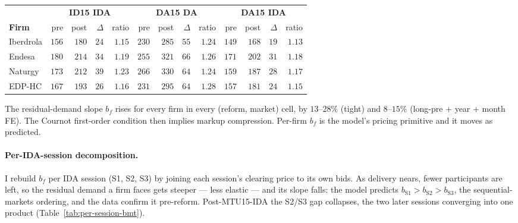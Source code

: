 \documentclass[11pt,a4paper]{article}
\theoremstyle{definition}
\theoremstyle{remark}
\theoremstyle{plain}
\begin{document}
\begin{center}
\footnotesize
\setlength{\tabcolsep}{4pt}
\begin{tabular}{l r r r r r r r r r r r r}
\toprule
        & \multicolumn{4}{c}{\textbf{ID15 IDA}} & \multicolumn{4}{c}{\textbf{DA15 DA}} & \multicolumn{4}{c}{\textbf{DA15 IDA}} \\
\cmidrule(lr){2-5} \cmidrule(lr){6-9} \cmidrule(lr){10-13}
\textbf{Firm}     & pre & post & $\Delta$ & ratio & pre & post & $\Delta$ & ratio & pre & post & $\Delta$ & ratio \\
\midrule
Iberdrola         & $156$ & $180$ & $24$ & $1.15$ & $230$ & $285$ & $55$ & $1.24$ & $149$ & $168$ & $19$ & $1.13$ \\
Endesa            & $180$ & $214$ & $34$ & $1.19$ & $255$ & $321$ & $66$ & $1.26$ & $171$ & $202$ & $31$ & $1.18$ \\
Naturgy           & $173$ & $212$ & $39$ & $1.23$ & $266$ & $330$ & $64$ & $1.24$ & $159$ & $187$ & $28$ & $1.17$ \\
EDP-HC            & $167$ & $193$ & $26$ & $1.16$ & $231$ & $295$ & $64$ & $1.28$ & $157$ & $181$ & $24$ & $1.15$ \\
\bottomrule
\end{tabular}
\label{tab:per-firm-residual-demand}
\end{center}

The residual-demand slope $b_f$ rises for every firm in every (reform, market) cell, by $13$--$28\%$ (tight) and $8$--$15\%$ (long-pre + year + month FE). The Cournot first-order condition then implies markup compression. Per-firm $b_f$ is the model's pricing primitive and it moves as predicted.

\paragraph{Per-IDA-session decomposition.} I rebuild $b_f$ per IDA session (S1, S2, S3) by joining each session's clearing price to its own bids. As delivery nears, fewer participants are left, so the residual demand a firm faces gets steeper --- less elastic --- and its slope falls: the model predicts $b_{\text{S1}} > b_{\text{S2}} > b_{\text{S3}}$, the sequential-markets ordering, and the data confirm it pre-reform. Post-MTU15-IDA the S2/S3 gap collapses, the two later sessions converging into one product (Table~\ref{tab:per-session-bmt}).
\end{document}
